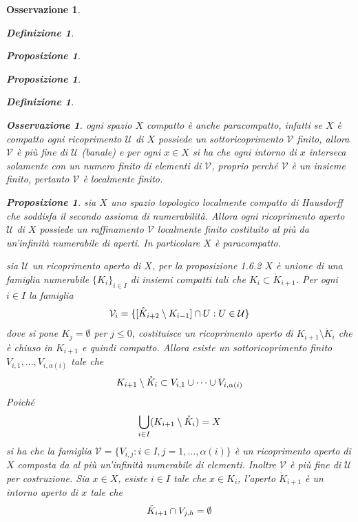 \documentclass[oneside, 11pt]{amsbook}
\makeatletter
\newcommand{\0}{{(0)}}
\newcommand{\3}{{(3)}}
\theoremstyle{colonplain}
\newtheorem{prop}[thm]{Proposizione}
\theoremstyle{colondefinition}
\newtheorem{defn}[thm]{Definizione}
\theoremstyle{colonremark}
\newtheorem{rmk}[thm]{Osservazione}
\numberwithin{equation}{chapter}
\renewcommand{\proofname}{Dimostrazione}
\renewenvironment{proof}[1][\proofname]{\par
  \pushQED{\end{proof}}%
  \normalfont \topsep6\p@\@plus6\p@\relax
  \trivlist
  \item[\hskip\labelsep\bfseries #1:]\ignorespaces
}{%
  \popQED\endtrivlist\@endpefalse
}
\makeatother
\begin{document}
\begin{rmk}
\begin{defn}
\begin{prop}
\begin{prop}
\begin{defn}
\end{defn}
\begin{rmk}
ogni spazio $X$ compatto è anche paracompatto, infatti se $X$ è compatto ogni ricoprimento $\mathcal{U}$ di $X$ possiede un sottoricoprimento $\mathcal{V}$ finito, allora $\mathcal{V}$ è più fine di $\mathcal{U}$ (banale) e per ogni $x \in X$ si ha che ogni intorno di $x$ interseca solamente con un numero finito di elementi di $\mathcal{V}$, proprio perché $\mathcal{V}$ è un insieme finito, pertanto $\mathcal{V}$ è localmente finito.
\end{rmk}
\begin{prop}
sia $X$ uno spazio topologico localmente compatto di Hausdorff che soddisfa il secondo assioma di numerabilità. Allora ogni ricoprimento aperto $\mathcal{U}$ di $X$ possiede un raffinamento $\mathcal{V}$ localmente finito costituito al più da un'infinità numerabile di aperti. In particolare $X$ è paracompatto.
\end{prop}
\begin{proof} 
sia $\mathcal{U}$ un ricoprimento aperto di $X$, per la \textit{proposizione 1.6.2} $X$ è unione di una famiglia numerabile $\{K_i\}_{i \in I}$ di insiemi compatti tali che $K_i \subset \mathring{K}_{i + 1}$. Per ogni $i \in I$ la famiglia 
\begin{align}
    \mathcal{V}_i = \{[\mathring{K}_{i + 2} \setminus K_{i - 1}] \cap U : U \in \mathcal{U}\} \notag
\end{align}
dove si pone $K_j = \emptyset$ per $j \leq 0$, costituisce un ricoprimento aperto di $K_{i + 1} \setminus \mathring{K}_i$ che è chiuso in $K_{i + 1}$ e quindi compatto. Allora esiste un sottoricoprimento finito $V_{i, 1}, \dots, V_{i, \alpha(i)}$ tale che 
\begin{align}
    K_{i + 1} \setminus \mathring{K}_i \subset V_{i, 1} \cup \dots \cup V_{i, \alpha(i)} \notag
\end{align}
Poiché 
\begin{align}
    \bigcup_{i \in I}(K_{i + 1} \setminus \mathring{K}_i) = X \notag
\end{align}
si ha che la famiglia $\mathcal{V} = \{V_{i, j} : i \in I, j = 1, \dots, \alpha(i)\}$ è un ricoprimento aperto di $X$ composta da al più un'infinità numerabile di elementi. Inoltre $\mathcal{V}$ è più fine di $\mathcal{U}$ per costruzione. Sia $x \in X$, esiste $i \in I$ tale che $x \in K_i$, l'aperto $\mathring{K}_{i + 1}$ è un intorno aperto di $x$ tale che 
\begin{align}
    \mathring{K}_{i + 1} \cap V_{j, h} = \emptyset \notag

\end{align}
\end{proof}
\end{prop}
\end{prop}
\end{defn}
\end{rmk}
\end{document}
